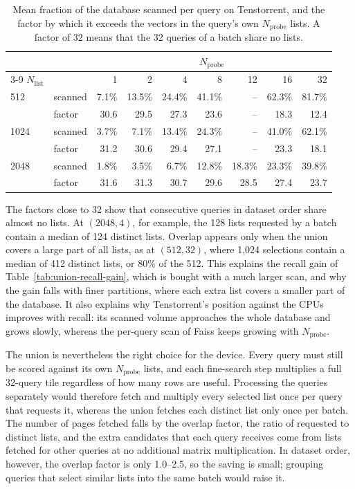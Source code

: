 \begin{table}[htbp]
\centering
\caption{Mean fraction of the database scanned per query on Tenstorrent, and
the factor by which it exceeds the vectors in the query's own
\(N_{\mathrm{probe}}\) lists. A factor of 32 means that the 32 queries of a
batch share no lists.}
\label{tab:union-scan}
\small
\setlength{\tabcolsep}{5pt}
\renewcommand{\arraystretch}{1.08}
\begin{tabular}{llrrrrrrr}
\toprule
& & \multicolumn{7}{c}{\(N_{\mathrm{probe}}\)} \\
\cmidrule(lr){3-9}
\(N_{\mathrm{list}}\) & & 1 & 2 & 4 & 8 & 12 & 16 & 32 \\
\midrule
512  & scanned & 7.1\% & 13.5\% & 24.4\% & 41.1\% & -- & 62.3\% & 81.7\% \\
     & factor  & 30.6 & 29.5 & 27.3 & 23.6 & -- & 18.3 & 12.4 \\
\midrule
1024 & scanned & 3.7\% & 7.1\% & 13.4\% & 24.3\% & -- & 41.0\% & 62.1\% \\
     & factor  & 31.2 & 30.6 & 29.4 & 27.1 & -- & 23.3 & 18.1 \\
\midrule
2048 & scanned & 1.8\% & 3.5\% & 6.7\% & 12.8\% & 18.3\% & 23.3\% & 39.8\% \\
     & factor  & 31.6 & 31.3 & 30.7 & 29.6 & 28.5 & 27.4 & 23.7 \\
\bottomrule
\end{tabular}
\end{table}

The factors close to 32 show that consecutive queries in dataset order share
almost no lists. At \((2048,4)\), for example, the 128 lists requested by a
batch contain a median of 124 distinct lists. Overlap appears only when the
union covers a large part of all lists, as at \((512,32)\), where 1,024
selections contain a median of 412 distinct lists, or 80\% of the 512. This
explains the recall gain of Table~\ref{tab:union-recall-gain}, which is bought
with a much larger scan, and why the gain falls with finer partitions, where
each extra list covers a smaller part of the database. It also explains why
Tenstorrent's position against the CPUs improves with recall: its scanned
volume approaches the whole database and grows slowly, whereas the per-query
scan of Faiss keeps growing with \(N_{\mathrm{probe}}\).

The union is nevertheless the right choice for the device. Every query must
still be scored against its own \(N_{\mathrm{probe}}\) lists, and each
fine-search step multiplies a full 32-query tile regardless of how many rows
are useful. Processing the queries separately would therefore fetch and
multiply every selected list once per query that requests it, whereas the
union fetches each distinct list only once per batch. The number of pages
fetched falls by the overlap factor, the ratio of requested to distinct lists,
and the extra candidates that each query receives come from lists fetched for
other queries at no additional matrix multiplication. In dataset order,
however, the overlap factor is only 1.0--2.5, so the saving is small; grouping
queries that select similar lists into the same batch would raise it.


